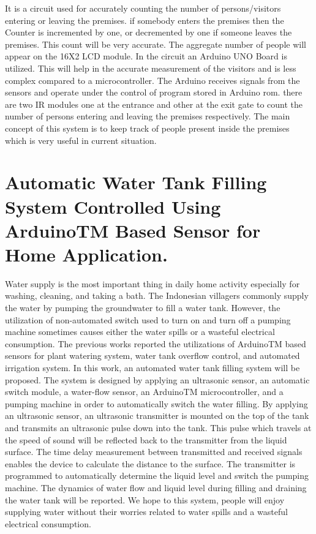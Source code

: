   \hspace{0.5cm} It is a circuit used for accurately counting the number of persons/visitors entering or leaving the premises. if somebody enters the premises then the Counter is incremented by one, or decremented by one if someone leaves the premises. This count will be very accurate. The aggregate number of people will appear on the 16X2 LCD module. In the circuit an Arduino UNO Board is utilized. This will help in the accurate measurement of the visitors and is less complex compared to a microcontroller. The Arduino receives signals from the sensors and operate under the control of program stored in Arduino rom. there are two IR modules one at the entrance and other at the exit gate to count the number of persons entering and leaving the premises respectively. The main concept of this system is to keep track of people present inside the premises which is very useful in current situation.
 

\newpage
\section{Automatic Water Tank Filling System Controlled Using ArduinoTM Based Sensor for Home Application.}
 \vspace{1cm} 
 
  \hspace{0.5cm}Water supply is the most important thing in daily home activity especially for washing, cleaning, and taking a bath. The Indonesian villagers commonly supply the water by pumping the groundwater to fill a water tank. However, the utilization of non-automated switch used to turn on and turn off a pumping machine sometimes causes either the water spills or a wasteful electrical consumption. The previous works reported the utilizations of ArduinoTM based sensors for plant watering system, water tank overflow control, and automated irrigation system. In this work, an automated water tank filling system will be proposed. The system is designed by applying an ultrasonic sensor, an automatic switch module, a water-flow sensor, an ArduinoTM microcontroller, and a pumping machine in order to automatically switch the water filling. By applying an ultrasonic sensor, an ultrasonic transmitter is mounted on the top of the tank and transmits an ultrasonic pulse down into the tank. This pulse which travels at the speed of sound will be reflected back to the transmitter from the liquid surface. The time delay measurement between transmitted and received signals enables the device to calculate the distance to the surface. The transmitter is programmed to automatically determine the liquid level and switch the pumping machine. The dynamics of water flow and liquid level during filling and draining the water tank will be reported. We hope to this system, people will enjoy supplying water without their worries related to water spills and a wasteful electrical consumption.
  
  
   